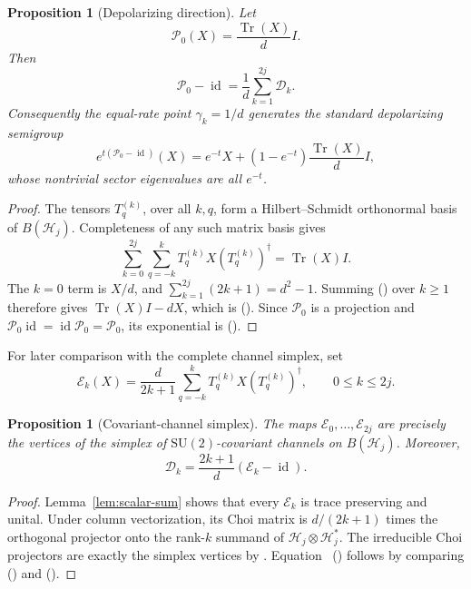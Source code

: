 \documentclass[twoside,10pt]{article}
\numberwithin{equation}{section}
\theoremstyle{slbody}
\newtheorem{proposition}[theorem]{Proposition}
\theoremstyle{definition}
\theoremstyle{remark}
\newcommand{\SU}{\mathrm{SU}(2)}
\newcommand{\Tr}{\operatorname{Tr}}
\newcommand{\id}{\operatorname{id}}
\newcommand{\cD}{\mathcal D}
\newcommand{\cE}{\mathcal E}
\newcommand{\cP}{\mathcal P}
\renewcommand{\eqref}[1]{%
  \textup{{\normalfont(\oldstylenums{\ref{#1}}}\normalfont)}}
\begin{document}
\begin{proposition}[Depolarizing direction]\label{prop:depolarizing-direction}
Let
\begin{equation}\label{eq:depolarizing-projection}
 \cP_0(X)=\frac{\Tr(X)}dI.
\end{equation}
Then
\begin{equation}\label{eq:depolarizing-generator-sum}
 \cP_0-\id=\frac1d\sum_{k=1}^{2j}\cD_k.
\end{equation}
Consequently the equal-rate point \(\gamma_k=1/d\) generates the
standard depolarizing semigroup
\begin{equation}\label{eq:depolarizing-semigroup}
 e^{t(\cP_0-\id)}(X)
 =e^{-t}X+(1-e^{-t})\frac{\Tr(X)}dI,
\end{equation}
whose nontrivial sector eigenvalues are all \(e^{-t}\).
\end{proposition}

\begin{proof}
The tensors \(T_q^{(k)}\), over all \(k,q\), form a
Hilbert--Schmidt orthonormal basis of \(B(\mathcal H_j)\).
Completeness of any such matrix basis gives
\begin{equation*}
 \sum_{k=0}^{2j}\sum_{q=-k}^k
 T_q^{(k)}X(T_q^{(k)})^\dagger=\Tr(X)I.
\end{equation*}
The \(k=0\) term is \(X/d\), and
\(\sum_{k=1}^{2j}(2k+1)=d^2-1\).  Summing
\eqref{eq:dissipator-simplified} over \(k\geq1\) therefore gives
\(\Tr(X)I-dX\), which is \eqref{eq:depolarizing-generator-sum}.
Since \(\cP_0\) is a projection and
\(\cP_0\id=\id\cP_0=\cP_0\), its exponential is
\eqref{eq:depolarizing-semigroup}.
\end{proof}

For later comparison with the complete channel simplex, set
\begin{equation}\label{eq:vertex-channel}
 \cE_k(X)=\frac{d}{2k+1}\sum_{q=-k}^k
 T_q^{(k)}X(T_q^{(k)})^\dagger,
 \qquad 0\leq k\leq2j.
\end{equation}
\begin{proposition}[Covariant-channel simplex]\label{prop:channel-simplex}
The maps \(\cE_0,\ldots,\cE_{2j}\) are precisely the vertices of the
simplex of \(\SU\)-covariant channels on \(B(\mathcal H_j)\).  Moreover,
\begin{equation}\label{eq:dissipator-vertex}
 \cD_k=\frac{2k+1}{d}(\cE_k-\id).
\end{equation}
\end{proposition}

\begin{proof}
Lemma~\ref{lem:scalar-sum} shows that every \(\cE_k\) is trace
preserving and unital.  Under column vectorization, its Choi matrix is
\(d/(2k+1)\) times the orthogonal projector onto the rank-\(k\)
summand of \(\mathcal H_j\otimes\mathcal H_j^*\).  The irreducible
Choi projectors are exactly the simplex vertices by
\cite[Sec.~1, Eqs.~(1.34)--(1.37), and Appendix A]
{AschieriRubaSolovej2024}.  Equation~\eqref{eq:dissipator-vertex}
follows by comparing \eqref{eq:dissipator-simplified} and
\eqref{eq:vertex-channel}.
\end{proof}
\end{document}

